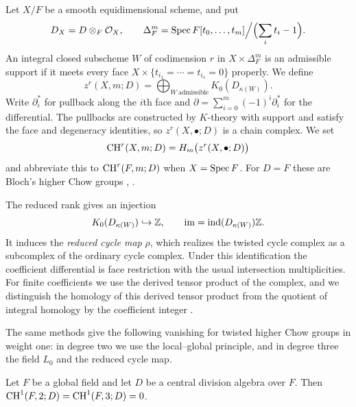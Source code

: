 \begin{definition}\label{def:paper-twisted-chow}
Let $X/F$ be a smooth equidimensional scheme, and put
\[
 D_X=D\otimes_F\mathcal O_X,\qquad \Delta_F^m=\operatorname{Spec} F[t_0,\ldots,t_m]\Big/\Bigl(\sum_i t_i-1\Bigr).
\]
An integral closed subscheme $W$ of codimension $r$ in $X\times\Delta_F^m$ is an admissible support if it meets every face $X\times\{t_{i_1}=\cdots=t_{i_s}=0\}$ properly.
We define
\[
 z^r(X,m;D)=\bigoplus_{W\ \text{admissible}}
                   K_0(D_{\kappa(W)}).
\]
Write $\partial_i^*$ for pullback along the $i$th face and $\partial=\sum_{i=0}^m(-1)^i\partial_i^*$ for the differential.
The pullbacks are constructed by $K$-theory with support and satisfy the face and degeneracy identities, so $z^r(X,\bullet;D)$ is a chain complex.
We set
\[
 \operatorname{CH}^r(X,m;D)=H_m\bigl(z^r(X,\bullet;D)\bigr)
\]
and abbreviate this to $\operatorname{CH}^r(F,m;D)$ when $X=\operatorname{Spec} F$.
For $D=F$ these are Bloch's higher Chow groups \cite{LevineHigherChow}, \cite[Definitions 5.6.1 and 5.6.3]{KahnLevine2010}.

The reduced rank gives an injection
\[
 K_0(D_{\kappa(W)})\hookrightarrow\mathbb Z,
 \qquad\operatorname{im}=\operatorname{ind}(D_{\kappa(W)})\mathbb Z.
\]
It induces the \emph{reduced cycle map} $\rho$, which realizes the twisted cycle complex as a subcomplex of the ordinary cycle complex.
Under this identification the coefficient differential is face restriction with the usual intersection multiplicities.
For finite coefficients we use the derived tensor product of the complex, and we distinguish the homology of this derived tensor product from the quotient of integral homology by the coefficient integer \cite[Sections 5.6 and 5.9, Theorem 6.5.3]{KahnLevine2010}.
\end{definition}

The same methods give the following vanishing for twisted higher Chow groups in weight one: in degree two we use the local--global principle, and in degree three the field $L_0$ and the reduced cycle map.

\begin{theorem}\label{thm:paper-global-weight-one}
Let $F$ be a global field and let $D$ be a central division algebra over $F$.
Then $\operatorname{CH}^1(F,2;D)=\operatorname{CH}^1(F,3;D)=0$.
\end{theorem}

